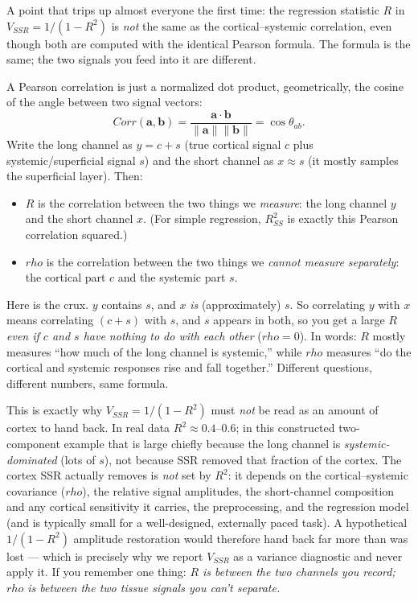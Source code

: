 \documentclass[12pt]{article}
\def\rho{rho}%
\def\mathrm#1{#1}%
\def\,{ }%
\begin{document}
A point that trips up almost everyone the first time: the regression statistic $R$ in $V_{\mathrm{SSR}}=1/(1-R^2)$ is \emph{not} the same as the cortical--systemic correlation, even though both are computed with the identical Pearson formula. The formula is the same; the two signals you feed into it are different.

A Pearson correlation is just a normalized dot product, geometrically, the cosine of the angle between two signal vectors:
\begin{equation}
\mathrm{Corr}(\mathbf{a},\mathbf{b}) = \frac{\mathbf{a}\cdot\mathbf{b}}{\lVert\mathbf{a}\rVert\,\lVert\mathbf{b}\rVert} = \cos\theta_{ab}.
\end{equation}
Write the long channel as $y = c + s$ (true cortical signal $c$ plus systemic/superficial signal $s$) and the short channel as $x \approx s$ (it mostly samples the superficial layer). Then:
\begin{itemize}
\item $R$ is the correlation between the two things we \emph{measure}: the long channel $y$ and the short channel $x$. (For simple regression, $R^2_{\mathrm{SS}}$ is exactly this Pearson correlation squared.)
\item $\rho$ is the correlation between the two things we \emph{cannot measure separately}: the cortical part $c$ and the systemic part $s$.
\end{itemize}

Here is the crux. $y$ contains $s$, and $x$ \emph{is} (approximately) $s$. So correlating $y$ with $x$ means correlating $(c+s)$ with $s$, and $s$ appears in both, so you get a large $R$ \emph{even if $c$ and $s$ have nothing to do with each other} ($\rho=0$). In words: $R$ mostly measures ``how much of the long channel is systemic,'' while $\rho$ measures ``do the cortical and systemic responses rise and fall together.'' Different questions, different numbers, same formula.

\begin{keyinsight}
This is exactly why $V_{\mathrm{SSR}}=1/(1-R^2)$ must \emph{not} be read as an amount of cortex to hand back. In real data $R^2\approx0.4$--$0.6$; in this constructed two-component example that is large chiefly because the long channel is \emph{systemic-dominated} (lots of $s$), not because SSR removed that fraction of the cortex. The cortex SSR actually removes is \emph{not} set by $R^2$: it depends on the cortical--systemic covariance ($\rho$), the relative signal amplitudes, the short-channel composition and any cortical sensitivity it carries, the preprocessing, and the regression model (and is typically small for a well-designed, externally paced task). A hypothetical $1/(1-R^2)$ amplitude restoration would therefore hand back far more than was lost --- which is precisely why we report $V_{\mathrm{SSR}}$ as a variance diagnostic and never apply it. If you remember one thing: \emph{$R$ is between the two channels you record; $\rho$ is between the two tissue signals you can't separate.}
\end{keyinsight}
\end{document}
